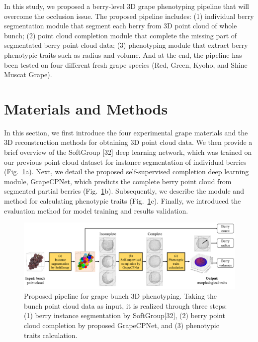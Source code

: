 \documentclass[12pt]{article}
\begin{document}
In this study, we proposed a berry-level 3D grape phenotyping pipeline that will overcome the occlusion issue. 
The proposed pipeline includes: 
(1) individual berry segmentation module that segment each berry from 3D point cloud of whole bunch; 
(2) point cloud completion module that complete the missing part of segmentated berry point cloud data; 
(3) phenotyping module that extract berry phenotypic traits such as radius and volume. 
And at the end, the pipeline has been tested on four different fresh grape species (Red, Green, Kyoho, and Shine Muscat Grape).

\section{Materials and Methods}

In this section, we first introduce the four experimental grape materials and the 3D reconstruction methods for obtaining 3D point cloud data. 
We then provide a brief overview of the SoftGroup [32] deep learning network, which was trained on our previous point cloud dataset for instance segmentation of individual berries (Fig.~\ref{fig:raw1}a). 
Next, we detail the proposed self-supervised completion deep learning module, GrapeCPNet, which predicts the complete berry point cloud from segmented partial berries (Fig.~\ref{fig:raw1}b). 
Subsequently, we describe the module and method for calculating phenotypic traits (Fig.~\ref{fig:raw1}c). 
Finally, we introduced the evaluation method for model training and results validation.

\begin{figure}[hbt!]
    \centering
    \includegraphics[width=1\textwidth]{figures/Figure1.pdf}
    \caption{Proposed pipeline for grape bunch 3D phenotyping. Taking the bunch point cloud data as input, it is realized through three steps: (1) berry instance segmentation by SoftGroup[32], (2) berry point cloud completion by proposed GrapeCPNet, and (3) phenotypic traits calculation.}
    \label{fig:raw1}
\end{figure}
\end{document}

